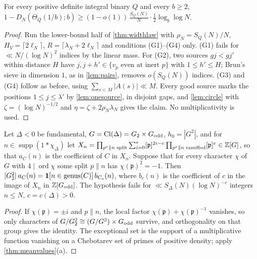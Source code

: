 \documentclass[11pt]{article}
\DeclareMathOperator{\supp}{supp}
\DeclareMathOperator{\ord}{ord}
\DeclareMathOperator{\Cl}{Cl}
\newcommand{\ind}{\mathbf 1}
\begin{document}
\begin{proposition}\label{prop:formlower}
For every positive definite integral binary $Q$ and every $b\ge2$,
$1-D_N(\Theta_Q(1/b);b)\ge(1-o(1))\,\frac{S_Q(N)}N\cdot\frac12\log_b\log N$.
\end{proposition}

\begin{proof}
Run the lower-bound half of \cref{thm:widthlaw} with $\rho_N=S_Q(N)/N$, $H_V=\lceil2\ell_N\rceil$,
$R=\lceil\lambda_N+2\ell_N\rceil$ and conditions (G1)--(G4) only. (G1) fails for
$\ll N/(\log N)^2$ indices by the linear mass. For (G2), two sources $gj<gj'$ within distance
$H$ have $j,j+h'\in\{v_p\text{ even at inert }p\}$ with $1\le h'\le H$; Brun's sieve in dimension
$1$, as in \cref{lem:pairs}, removes $o(S_Q(N))$ indices. (G3) and (G4) follow as before, using
$\sum_{s<M}|A(s)|\ll M$. Every good source marks the positions $1\le j\le\lambda'$ by
\cref{lem:onesource}, in disjoint gaps, and \cref{lem:circle} with
$\zeta=(\log N)^{-1/2}$ and $\eta=\zeta+2\rho_N\lambda_N$ gives the claim. No multiplicativity is
used.
\end{proof}

\begin{lemma}\label{lem:annihilation}
Let $\Delta<0$ be fundamental, $G=\Cl(\Delta)=G_2\times G_{\rm odd}$, $h_0=|G^2|$, and for
$n\in\supp(1*\chi_\Delta)$ let
$X_n=\prod_{p^e\|n\text{ split}}\sum_{i=0}^e[\mathfrak p]^{2i-e}\prod_{p^e\|n\text{ ramified}}[\mathfrak p]^e\in\mathbb Z[G]$,
so that $a_C(n)$ is the coefficient of $C$ in $X_n$. Suppose that for every character $\chi$
of $G$ with $4\mid\ord\chi$ some split $p\|n$ has $\chi(\mathfrak p)^2=-1$. Then
$|G_2^2|\,a_C(n)=\ind[n\in\mathrm{genus}(C)]\,b_{C_{\rm o}}(n)$, where $b_c(n)$ is the coefficient
of $c$ in the image of $X_n$ in $\mathbb Z[G_{\rm odd}]$. The hypothesis fails for
$\ll S_\Delta(N)(\log N)^{-c}$ integers $n\le N$, $c=c(\Delta)>0$.
\end{lemma}

\begin{proof}
If $\chi(\mathfrak p)=\pm i$ and $p\|n$, the local factor $\chi(\mathfrak p)+\chi(\mathfrak p)^{-1}$
vanishes, so only characters of $G/G_2^2\cong(G/G^2)\times G_{\rm odd}$ survive, and orthogonality
on that group gives the identity. The exceptional set is the support of a multiplicative
function vanishing on a Chebotarev set of primes of positive density; apply
\cref{thm:meanvalues}(a).
\end{proof}
\end{document}
